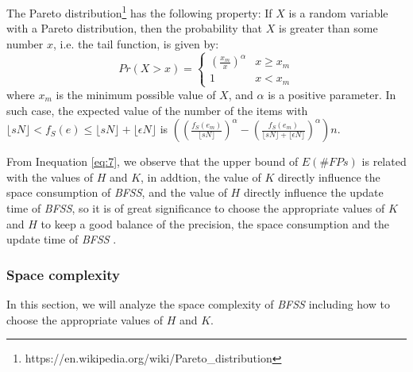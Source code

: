 \documentclass[conference]{IEEEtran}
\begin{document}
\begin{IEEEproof}
The Pareto distribution\footnote{https://en.wikipedia.org/wiki/Pareto\_distribution} has the following property: If $X$ is a random variable with a Pareto distribution, then the probability that $X$ is greater than some number $x$, i.e. the tail function, is given by:
$$Pr(X>x)=
\begin{cases}
(\frac{x_m}{x})^\alpha & x\geq x_m\\
1 & x<x_m
\end{cases}$$
where $x_m$ is the minimum possible value of $X$, and $\alpha$ is a positive parameter. In such case, the expected value of the number of the items with $\lfloor sN\rfloor<f_S(e)\leq \lfloor sN\rfloor+\lfloor \epsilon N\rfloor$ is $((\frac{f_S(e_m)}{\lfloor sN\rfloor})^\alpha-(\frac{f_S(e_m)}{\lfloor sN\rfloor+\lfloor \epsilon N\rfloor})^\alpha)n$.
\end{IEEEproof}
From Inequation \ref{eq:7}, we observe that the upper bound of $E(\#FPs)$ is related with the values of $H$ and $K$, in addtion, the value of $K$ directly influence the space consumption of \emph{BFSS}, and the value of $H$ directly influence the update time of \emph{BFSS}, so it is of great significance to choose the appropriate values of $K$ and $H$ to keep a good balance of the precision, the space consumption and the update time of \emph{BFSS} .


\subsubsection{\textbf{Space complexity}}\label{sec:space}
In this section, we will analyze the space complexity of \emph{BFSS} including how to choose the appropriate values of $H$ and $K$.
\end{document}
